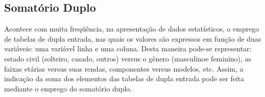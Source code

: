 \subsection{Somatório Duplo}

Acontece com muita freqüência, na apresentação de dados estatísticos, o emprego de tabelas de dupla entrada, nas quais os valores são expressos em função de duas variáveis: uma variável linha e uma coluna. Desta maneira pode-se representar: estado civil (solteiro, casado, outros) versus o gênero (masculinoe feminino), as faixas etárias versus suas rendas, componentes versus modelos, etc. Assim, a indicação da soma dos elementos das tabelas de dupla entrada pode ser feita mediante o emprego do somatório duplo.\vskip0.3cm








\newpage



